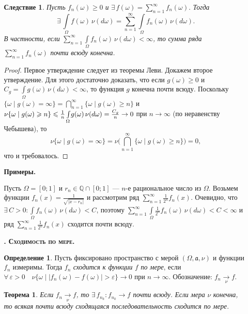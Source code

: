 \documentclass[12pt,titlepage]{article}
\newcounter{tema}
\renewcommand{\thetema}{\arabic{tema}}
\newcommand*{\tema}[1]{\vspace{10pt}
\begin{center}{\textbf{\refstepcounter{tema}
\textsc{\thetema. #1.}}}\vspace{7pt}
\end{center}}
\newcommand{\prim}{\vspace{5pt}\noindent\textbf{Примеры.}}
\newtheorem{theorem}{Теорема}[tema]
\newtheorem{sled}{Следствие}[tema]
\theoremstyle{definition}
\newtheorem{defen}{Определение}[tema]
\newcommand*{\p}[1]{#1\nobreak\discretionary{}{\hbox{$\mathsurround=0pt #1$}}{}}
\begin{document}
\begin{sled}
Пусть $f_n(\omega)\geqslant 0$ и $\exists\,
f(\omega)=\sum\limits_{n=1}^\infty f_n(\omega)$. Тогда
$$\exists\,\int\limits_\Omega\!
f(\omega)\,\nu(d\omega)=\sum\limits_{n=1}^\infty
\int\limits_\Omega\! f_n(\omega)\,\nu(d\omega).$$ В частности, если
$\sum\limits_{n=1}^\infty \int\limits_\Omega\!
f_n(\omega)\,\nu(d\omega)<\infty$, то сумма ряда
$\sum\limits_{n=1}^\infty f_n(\omega)$ почти всюду конечна.
\end{sled}

\begin{proof}
Первое утверждение следует из теоремы Леви. Докажем второе
утверждение. Для этого достаточно доказать, что если
$g(\omega)\geqslant 0$ и $C_g=\int\limits_\Omega\!
g(\omega)\,\nu(d\omega)<\infty$, то функция $g$ конечна почти всюду.
Поскольку $\{\omega\mid
g(\omega)=\infty\}=\bigcap\limits_{n=1}^\infty \{\omega\mid
g(\omega)\geqslant n\}$ и $\nu\{\omega\mid g(\omega)\geqslant
n\}\p\leqslant\frac 1 n\int\limits_\Omega\!
g(\omega)\,\nu(d\omega)=\frac{C_g}{n}\to 0$ при $n\to\infty$ (по
неравенству Чебышева), то
$$\nu\{\omega\mid g(\omega)=\infty\}=\nu\Big(\bigcap\limits_{n=1}^\infty
\{\omega\mid g(\omega)\geqslant n\}\Big)=0,$$ что и требовалось.
\end{proof}

\prim

Пусть $\Omega=[0;1]$ и $r_n\in\mathbb{Q}\cap[0;1]$ --- $n$-е
рациональное число из $\Omega$. Возьмем функции
$f_n(x)=\frac{1}{\sqrt{|x-r_n|}}$ и рассмотрим ряд
$\sum\limits_{n=1}^\infty \frac{1}{2^n} f_n(x)$. Очевидно, что
$\exists\, C>0: \int\limits_\Omega\! f_n(\omega)\,\nu(d\omega)<C$,
поэтому $\sum\limits_{n=1}^\infty \int\limits_\Omega\!
\frac{1}{2^n}f_n(\omega)\,\nu(d\omega)<C<\infty$ и ряд
$\sum\limits_{n=1}^\infty \frac{1}{2^n} f_n(x)$ сходится почти
всюду.

\tema{Сходимость по мере}

\begin{defen}
Пусть фиксировано пространство с мерой $(\Omega, \mathfrak{a},\nu)$
и функции $f_n$ измеримы. Тогда $f_n$ \emph{сходится к функции $f$
по мере}, если $\forall\, \varepsilon>0\quad \nu\{\omega\mid
|f_n(\omega)-f(\omega)|>\varepsilon\}\to 0$ при $n\to\infty$.
Обозначение: $f_n\mathop{\to}\limits_\nu f$.
\end{defen}

\begin{theorem}
Если $f_n\mathop{\to}\limits_\nu f$, то $\exists\, f_{n_k}:
f_{n_k}\to f$ почти всюду. Если мера $\nu$ конечна, то всякая почти
всюду сходящаяся последовательность сходится по мере.
\end{theorem}
\end{document}
